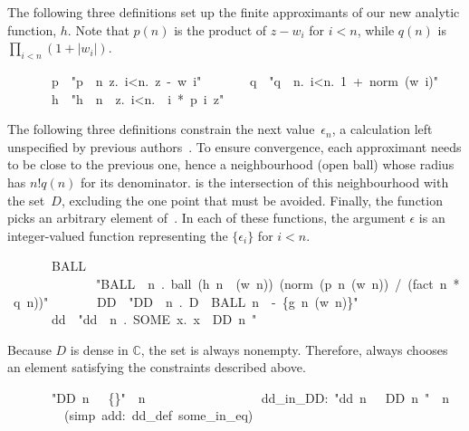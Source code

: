 \documentclass[runningheads]{llncs}
\begin{document}
The following three definitions set up the finite approximants of our new analytic function, $h$.
Note that $p(n)$ is the product of $z - w_i$ for $i<n$, while $q(n)$ is $\prod_{i<n} (1 + |w_i|)$.

\begin{isabelle}
\ \ \ \ \ \ \ p\ \ "p\ \isasymequiv \ \isasymlambda n\ z.\ \isasymProd i<n.\ z\ -\ w\ i"\isanewline
\ \ \ \ \ \ \ q\ \ "q\ \isasymequiv \ \isasymlambda n.\ \isasymProd i<n.\ 1\ +\ norm\ (w\ i)"\isanewline
\ \ \ \ \ \ \ h\ \ "h\ \isasymequiv \ \isasymlambda n\ \isasymepsilon \ z.\ \isasymSum i<n.\ \isasymepsilon \ i\ *\ p\ i\ z"
\end{isabelle}

The following three definitions constrain the next value~$\epsilon_n$, a calculation left unspecified by previous authors~\cite{aigner-proofs,erdos-interpolation}. To ensure convergence, each approximant needs to be close to the previous one, hence a neighbourhood (open ball) whose radius has $n!q(n)$ for its denominator.  is the intersection of this neighbourhood with the set~$D$, excluding the one point that must be avoided. Finally, the function  picks an arbitrary element of~\@.
In each of these functions, the argument $\epsilon$ is an integer-valued function representing the $\{\epsilon_i\}$ for $i<n$.

\begin{isabelle}
\ \ \ \ \ \ \ BALL\ \isanewline
\ \ \ \ \ \ \ \ \ \ \ \ \ \ "BALL\ \isasymequiv \ \isasymlambda n\ \isasymepsilon .\ ball\ (h\ n\ \isasymepsilon \ (w\ n))\ (norm\ (p\ n\ (w\ n))\ /\ (fact\ n\ *\ q\ n))"\isanewline
\ \ \ \ \ \ \ DD\ \ "DD\ \isasymequiv \ \isasymlambda n\ \isasymepsilon .\ D\ \isasyminter \ BALL\ n\ \isasymepsilon \ -\ \{g\ n\ (w\ n)\}"\isanewline
\ \ \ \ \ \ \ dd\ \ "dd\ \isasymequiv \ \isasymlambda n\ \isasymepsilon .\ SOME\ x.\ x\ \isasymin \ DD\ n\ \isasymepsilon"
\end{isabelle}
%
Because $D$ is dense in $\mathbb{C}$, the set  is always nonempty. Therefore,  always chooses an element satisfying the constraints described above.

\begin{isabelle}
\ \ \ \ \ \ \ "DD\ n\ \isasymepsilon \ \isasymnoteq \ \{\}"\ \ n\ \isasymepsilon \isanewline
\ \ \ \ \ \ \ \ \prf\isanewline
\ \ \ \ \ \ \ \ dd\_in\_DD:\ "dd\ n\ \isasymepsilon \ \isasymin \ DD\ n\ \isasymepsilon "\ \ n\ \isasymepsilon \isanewline
\ \ \ \ \ \ \ \ \ (simp\ add:\ dd\_def\ some\_in\_eq)
\end{isabelle}
\end{document}
